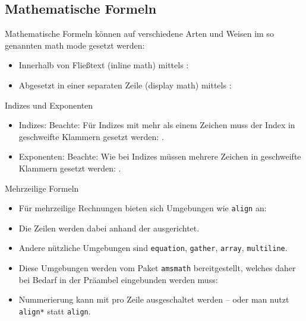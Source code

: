 \subsection{Mathematische Formeln}

\begin{frame}{\subsecname}
    Mathematische Formeln können auf verschiedene Arten und Weisen im so genannten \alert{math mode}
    gesetzt werden:
    \begin{itemize}
        \item Innerhalb von Fließtext (\alert{inline math}) mittels :
        \item Abgesetzt in einer separaten Zeile (\alert{display math}) mittels \code{[...]}:
    \end{itemize}
\end{frame}

\begin{frame}{Indizes und Exponenten}
    \begin{itemize}
        \item Indizes:
            Beachte: Für Indizes mit mehr als einem Zeichen muss der Index in geschweifte Klammern
            gesetzt werden: .
        \item Exponenten:
            Beachte: Wie bei Indizes müssen mehrere Zeichen in geschweifte Klammern gesetzt werden:
            .
    \end{itemize}
\end{frame}

\begin{frame}{Mehrzeilige Formeln}
    \begin{itemize}
        \item Für mehrzeilige Rechnungen bieten sich Umgebungen wie \texttt{align} an:
        \item Die Zeilen werden dabei anhand der \code{&} ausgerichtet.
        \item Andere nützliche Umgebungen sind \texttt{equation}, \texttt{gather}, \texttt{array},
            \texttt{multiline}.
        \item Diese Umgebungen werden vom Paket \texttt{amsmath} bereitgestellt, welches daher bei
            Bedarf in der Präambel eingebunden werden muss:
            \begin{center}
            \end{center}
        \item Nummerierung kann mit \code{\\nonumber} pro Zeile ausgeschaltet werden -- oder man
            nutzt \texttt{align*} statt \texttt{align}.
    \end{itemize}
\end{frame}

